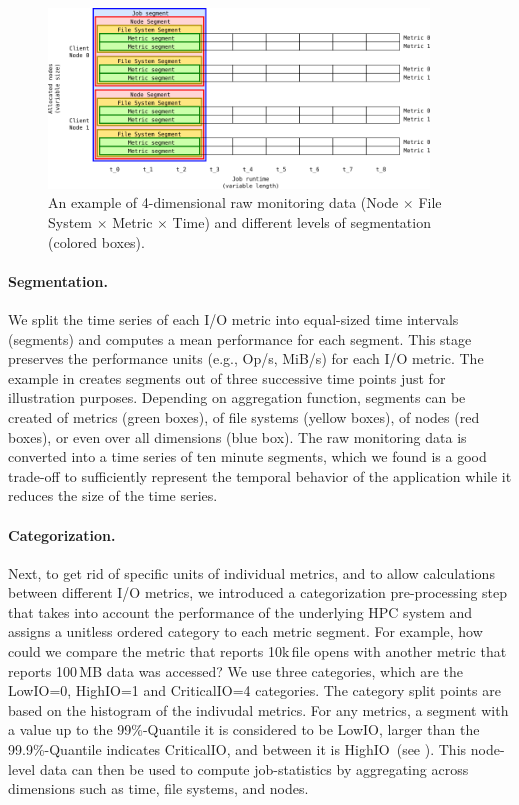 \documentclass{jhps}
\begin{document}
\begin{figure}[bt]
 \centering
 \includegraphics[width=0.9\textwidth]{assets/stats3.png}
 \caption{An example of 4-dimensional raw monitoring data (Node $\times$ File System $\times$ Metric $\times$ Time) and different levels of segmentation (colored boxes).}%
 \label{fig:generic_example}
\end{figure}

\paragraph{Segmentation.}
We split the time series of each I/O metric into equal-sized time intervals (segments) and computes a mean performance for each segment.
This stage preserves the performance units (e.g., Op/s, MiB/s) for each I/O metric.
The example in  creates segments out of three successive time points just for illustration purposes.
Depending on aggregation function, segments can be created of metrics (green boxes), of file systems (yellow boxes), of nodes (red boxes), or even over all dimensions (blue box).
The raw monitoring data is converted into a time series of ten minute segments, which we found is a good trade-off to sufficiently represent the temporal behavior of the application while it reduces the size of the time series.

\paragraph{Categorization.}
Next, to get rid of specific units of individual metrics, and to allow calculations between different I/O metrics, we introduced a categorization pre-processing step that takes into account the performance of the underlying HPC system and assigns a unitless ordered category to each metric segment.
For example, how could we compare the metric that reports 10k\,file opens with another metric that reports 100\,MB data was accessed?
We use three categories, which are the LowIO=0, HighIO=1 and CriticalIO=4 categories.
The category split points are based on the histogram of the indivudal metrics.
For any metrics, a segment with a value up to the 99\%-Quantile it is considered to be LowIO, larger than the 99.9\%-Quantile indicates CriticalIO, and between it is HighIO~(see \cite{iocats2020}).
This node-level data can then be used to compute job-statistics by aggregating across dimensions such as time, file systems, and nodes.
\end{document}
